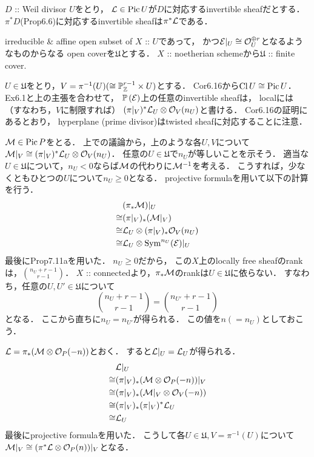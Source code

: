\documentclass[a4paper]{jsarticle}
\newcommand{\coverU}{\mathfrak{U}}
\newcommand{\Cl}{\operatorname{Cl}}
\newcommand{\Pic}{\operatorname{Pic}}
\newcommand{\pbundle}{\mathbb{P}\,}
\begin{document}
    \begin{Cor}
        $D$ :: Weil divisor $U$をとり，
        $\shL \in \Pic U$が$D$に対応するinvertible sheafだとする．
        $\pi^* D$(Prop6.6)に対応するinvertible sheafは$\pi^* \mathcal{L}$である．
    \end{Cor}

    irreducible \& affine open subset of $X$ :: $U$であって，
    かつ$\mathcal{E}|_U \cong \mathcal{O}_U^{\oplus r}$となるようなものからなる
    open coverを$\coverU$とする．
    $X$ :: noetherian schemeから$\coverU$ :: finite cover.

    $U \in \coverU$をとり，$V=\pi^{-1}(U) (\cong \mathbb{P}^{r-1}_{\mathbb{Z}} \times U)$とする．
    Cor6.16から$\Cl U \iso \Pic U$．
    Ex6.1と上の主張を合わせて，
    $\pbundle(\shE)$上の任意のinvertible sheafは，
    localには（すなわち，$V$に制限すれば）
    $(\pi|_V)^* \mathcal{L}_U \otimes \mathcal{O}_V(n_U)$と書ける．
    Cor6.16の証明にあるとおり，
    hyperplane (prime divisor)はtwisted sheafに対応することに注意．

    $\shM \in \Pic P$をとる．
    上での議論から，上のような各$U, V$について
    $\mathcal{M}|_V \cong (\pi|_V)^* \mathcal{L}_U \otimes \mathcal{O}_V(n_U)$．
    任意の$U \in \coverU$で$n_U$が等しいことを示そう．
    適当な$U \in \coverU$について，$n_{U}<0$ならば$\mathcal{M}$の代わりに$\mathcal{M}^{-1}$を考える．
    こうすれば，少なくともひとつの$U$について$n_{U} \geq 0$となる．
    projective formulaを用いて以下の計算を行う．
    \begin{align*}
        {}&     (\pi_*\mathcal{M})|_{U} \\
        \cong&   (\pi|_V)_* (\mathcal{M}|_V) \\
        \cong&   \mathcal{L}_U \otimes (\pi|_V)_* \mathcal{O}_V(n_U) \\
        \cong&   \mathcal{L}_U \otimes \operatorname{Sym}^{n_{U}}(\mathcal{E})|_U
    \end{align*}
    最後にProp7.11aを用いた．
    $n_U \geq 0$だから，
    この$X$上のlocally free sheafのrankは，$\binom{n_U+r-1}{r-1}$．
    $X$ :: connectedより，$\pi_* \mathcal{M}$のrankは$U \in \coverU$に依らない．
    すなわち，任意の$U, U' \in \coverU$について
    \[ \binom{n_U+r-1}{r-1}=\binom{n_{U'}+r-1}{r-1} \]
    となる．
    ここから直ちに$n_U=n_{U'}$が得られる．
    この値を$n (=n_U)$としておこう．


    $\mathcal{L}=\pi_*(\mathcal{M} \otimes \mathcal{O}_P(-n))$とおく．
    すると$\mathcal{L}|_U=\mathcal{L}_U$が得られる．
    \begin{align*}
        {}&     \mathcal{L}|_U \\
        \cong&   (\pi|_V)_* (\mathcal{M} \otimes \mathcal{O}_P(-n))|_V \\
        \cong&   (\pi|_V)_* (\mathcal{M}|_V \otimes \mathcal{O}_V(-n)) \\
        \cong&   (\pi|_V)_* (\pi|_V)^*\mathcal{L}_U \\
        \cong&   \mathcal{L}_U
    \end{align*}
    最後にprojective formulaを用いた．
    こうして各$U \in \coverU, V=\pi^{-1}(U)$について
    $\mathcal{M}|_V \cong (\pi^* \mathcal{L} \otimes \mathcal{O}_P(n))|_V$となる．
\end{document}

